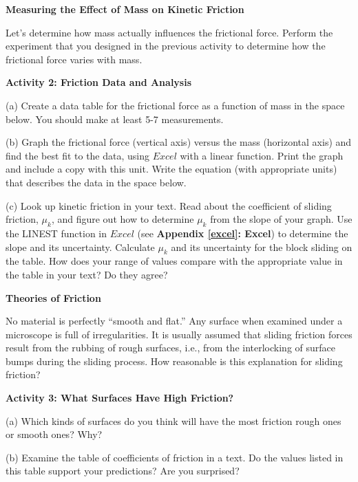 \textbf{Measuring the Effect of Mass on Kinetic Friction }

Let's determine how mass actually influences the frictional force. Perform the
experiment that you designed in the previous activity to determine how the frictional
force varies with mass. 

\newpage

\textbf{Activity 2: Friction Data and Analysis }

(a) Create a data table for the frictional force as a function of mass in the
space below. You should make at least 5-7 measurements. 
\vspace{45mm}

(b) Graph the frictional force (vertical axis) versus the mass (horizontal 
axis) and find the best fit to the data, using $Excel$ with a linear function. 
Print the graph and include a copy with this unit. Write the equation (with 
appropriate units) that describes the data in the space below. 
\vspace{15mm}

(c) Look up kinetic friction in your text. Read about the coefficient
of sliding friction, \( \mu _{k} \), and figure out how to determine 
\( \mu _{k} \) from the slope of your graph. Use the LINEST function in $Excel$ (see \textbf{Appendix \ref{excel}: Excel}) to determine the slope and its uncertainty.  Calculate \( \mu _{k} \) and its uncertainty for the block sliding on
the table. How does your range of values compare with the appropriate value in 
the table in your text? Do they agree?
\vspace{30mm}

\textbf{Theories of Friction} 

No material is perfectly ``smooth and flat.'' Any surface when
examined under a microscope is full of irregularities. It is usually assumed
that sliding friction forces result from the rubbing of rough surfaces, i.e.,
from the interlocking of surface bumps during the sliding process. How reasonable
is this explanation for sliding friction?

\textbf{Activity 3: What Surfaces Have High Friction?} 

(a) Which kinds of surfaces do you think will have the most friction rough ones
or smooth ones? Why?
\vspace{20mm}

(b) Examine the table of coefficients of friction in a text. Do the values listed
in this table support your predictions? Are you surprised? 
\vspace{20mm}

